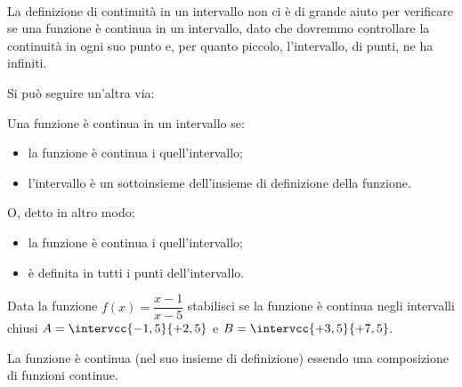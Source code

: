 \begin{esempio}
~

\end{esempio}

La definizione di continuità in un intervallo non ci è di grande aiuto per 
verificare se una funzione è continua in un intervallo, dato che dovremmo 
controllare la continuità in ogni suo punto e, per quanto piccolo, 
l'intervallo, di punti, ne ha infiniti.

Si può seguire un'altra via: 

\begin{definizione}
Una funzione è continua in un intervallo se:
\begin{itemize} [noitemsep]
\item 
la funzione è continua i quell'intervallo;
\item 
l'intervallo è un sottoinsieme dell'insieme di definizione della funzione.
\end{itemize}
O, detto in altro modo: 
\begin{itemize} [noitemsep]
\item 
la funzione è continua i quell'intervallo;
\item 
è definita in tutti i punti dell'intervallo.
\end{itemize}
\end{definizione}

\begin{esempio}
Data la funzione \(f(x) = \dfrac{x-1}{x-5}\) stabilisci se la funzione è 
continua negli intervalli chiusi \(A=\intervcc{-1,5}{+2,5}\) e 
\(B=\intervcc{+3,5}{+7,5}\).

La funzione è continua (nel suo insieme di definizione) essendo una 
composizione di funzioni continue.

\end{esempio}


